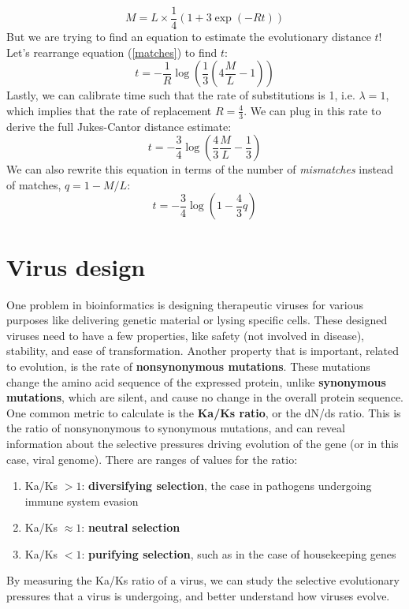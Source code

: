 \documentclass[12pt]{article}
\begin{document}
\begin{equation}
    M = L \times \frac{1}{4}\left(1 + 3\exp\left(-Rt\right)\right)
    \label{matches}
\end{equation}
But we are trying to find an equation to estimate the evolutionary distance $t$! Let's rearrange equation (\ref{matches}) to find $t$:
\begin{equation}
    t = -\frac{1}{R} \log \left(\frac{1}{3}\left(4\frac{M}{L} - 1 \right)\right)
    \label{calc_t}
\end{equation}
Lastly, we can calibrate time such that the rate of substitutions is 1, i.e. $\lambda = 1$, which implies that the rate of replacement $R = \frac{4}{3}$. We can plug in this rate to derive the full Jukes-Cantor distance estimate:
\begin{equation}
    t = -\frac{3}{4} \log \left(\frac{4}{3}\frac{M}{L} - \frac{1}{3} \right)
    \label{final_jc}
\end{equation}
We can also rewrite this equation in terms of the number of \textit{mismatches} instead of matches, $q = 1-M/L$:
\begin{equation}
    t = -\frac{3}{4} \log \left(1 - \frac{4}{3}q \right)
    \label{jukesbox_hero}
\end{equation}

\section{Virus design}
One problem in bioinformatics is designing therapeutic viruses for various purposes like delivering genetic material or lysing specific cells. These designed viruses need to have a few properties, like safety (not involved in disease), stability, and ease of transformation. Another property that is important, related to evolution, is the rate of \textbf{nonsynonymous mutations}. These mutations change the amino acid sequence of the expressed protein, unlike \textbf{synonymous mutations}, which are silent, and cause no change in the overall protein sequence. One common metric to calculate is the \textbf{Ka/Ks ratio}, or the dN/ds ratio. This is the ratio of nonsynonymous to synonymous mutations, and can reveal information about the selective pressures driving evolution of the gene (or in this case, viral genome). There are ranges of values for the ratio:
\begin{enumerate}
    \item Ka/Ks $>1$: \textbf{diversifying selection}, the case in pathogens undergoing immune system evasion
    \item Ka/Ks $\approx 1$: \textbf{neutral selection}
    \item Ka/Ks $< 1$: \textbf{purifying selection}, such as in the case of housekeeping genes
\end{enumerate}
By measuring the Ka/Ks ratio of a virus, we can study the selective evolutionary pressures that a virus is undergoing, and better understand how viruses evolve.
\end{document}

